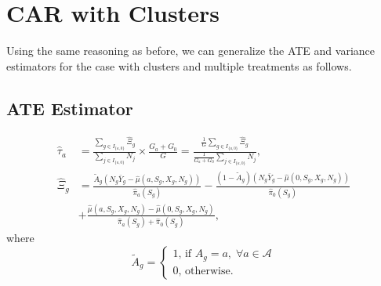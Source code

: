 \documentclass{article}
\begin{document}
\section{CAR with Clusters}

Using the same reasoning as before, we can generalize the ATE and variance estimators for the case with clusters and multiple treatments as follows.
\subsection*{ATE Estimator}
\begin{align}
\hat{\tau}_a &= \frac{\sum_{g \in I_{\{a,0\}}} \hat{\Xi}_g}{\sum_{j \in I_{\{a,0\}}}N_j} \times \frac{G_a + G_0}{G}= \frac{\frac{1}{G}\sum_{g \in I_{\{a,0\}}}\hat{\Xi}_g}{\frac{1}{G_a + G_0}\sum_{j \in I_{\{a,0\}}}N_j} , \nonumber \\
\hat{\Xi}_g &= \frac{\tilde{A}_g \left(N_g\bar{Y}_g - \hat{\mu}(a,S_g,X_g,N_g)\right)}{\hat{\pi}_a(S_g)} - \frac{(1 - \tilde{A}_g) \left(N_g\bar{Y}_g - \hat{\mu}(0,S_g,X_g,N_g)\right)}{\hat{\pi}_0(S_g)}\nonumber \\
 &+ \frac{\hat{\mu}(a,S_g,X_g,N_g) - \hat{\mu}(0,S_g,X_g,N_g)}{\hat{\pi}_a(S_g) + \hat{\pi}_0(S_g)}, \nonumber
\end{align}
where 
\[\tilde{A}_g = \begin{cases}1\text{, if }A_g = a, \; \forall a \in \mathcal{A} \\ 0\text{, otherwise.}\end{cases}\]
\end{document}
